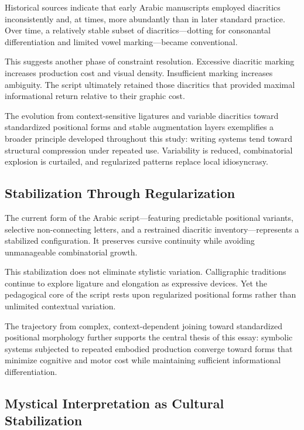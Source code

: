\documentclass[11pt]{article}
\begin{document}
Historical sources indicate that early Arabic manuscripts employed diacritics inconsistently and, at times, more abundantly than in later standard practice. Over time, a relatively stable subset of diacritics—dotting for consonantal differentiation and limited vowel marking—became conventional.

This suggests another phase of constraint resolution. Excessive diacritic marking increases production cost and visual density. Insufficient marking increases ambiguity. The script ultimately retained those diacritics that provided maximal informational return relative to their graphic cost.

The evolution from context-sensitive ligatures and variable diacritics toward standardized positional forms and stable augmentation layers exemplifies a broader principle developed throughout this study: writing systems tend toward structural compression under repeated use. Variability is reduced, combinatorial explosion is curtailed, and regularized patterns replace local idiosyncrasy.

\subsection{Stabilization Through Regularization}

The current form of the Arabic script—featuring predictable positional variants, selective non-connecting letters, and a restrained diacritic inventory—represents a stabilized configuration. It preserves cursive continuity while avoiding unmanageable combinatorial growth.

This stabilization does not eliminate stylistic variation. Calligraphic traditions continue to explore ligature and elongation as expressive devices. Yet the pedagogical core of the script rests upon regularized positional forms rather than unlimited contextual variation.

The trajectory from complex, context-dependent joining toward standardized positional morphology further supports the central thesis of this essay: symbolic systems subjected to repeated embodied production converge toward forms that minimize cognitive and motor cost while maintaining sufficient informational differentiation.

\subsection{Mystical Interpretation as Cultural Stabilization}
\end{document}
